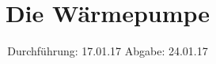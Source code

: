 

\subject{V206}
\title{Die Wärmepumpe}
\date{
  Durchführung: 17.01.17
  \hspace{3em}
  Abgabe: 24.01.17
}



\maketitle
\thispagestyle{empty}
\tableofcontents
\newpage






\printbibliography


